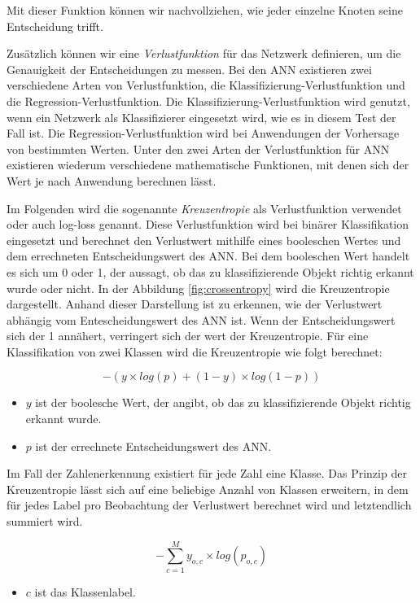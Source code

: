 Mit dieser Funktion können wir nachvollziehen, wie jeder einzelne Knoten seine Entscheidung trifft.\cite*{Braspenning1995}

Zusätzlich können wir eine \textit{Verlustfunktion} für das Netzwerk definieren, um die Genauigkeit der Entscheidungen zu messen. Bei den ANN existieren zwei verschiedene Arten von Verlustfunktion, die Klassifizierung-Verlustfunktion und die Regression-Verlustfunktion. 
Die Klassifizierung-Verlustfunktion wird genutzt, wenn ein Netzwerk als Klassifizierer eingesetzt wird, wie es in diesem Test der Fall ist. Die Regression-Verlustfunktion wird bei Anwendungen der Vorhersage von bestimmten Werten.
Unter den zwei Arten der Verlustfunktion für ANN existieren wiederum verschiedene mathematische Funktionen, mit denen sich der Wert je nach Anwendung berechnen lässt.\cite{dwivedi_2020}

Im Folgenden wird die sogenannte \textit{Kreuzentropie} als Verlustfunktion verwendet oder auch log-loss genannt. Diese Verlustfunktion wird bei binärer Klassifikation eingesetzt und berechnet den Verlustwert mithilfe eines booleschen Wertes und dem errechneten Entscheidungswert des ANN. Bei dem booleschen Wert handelt es sich um 0 oder 1, der aussagt, ob das zu klassifizierende Objekt richtig erkannt wurde oder nicht. In der Abbildung \ref*{fig:crossentropy} wird die Kreuzentropie dargestellt. Anhand dieser Darstellung ist zu erkennen, wie der Verlustwert abhängig vom Entescheidungswert des ANN ist. Wenn der Entscheidungswert sich der 1 annähert, verringert sich der wert der Kreuzentropie.
Für eine Klassifikation von zwei Klassen wird die Kreuzentropie wie folgt berechnet: 

\[-(y\times log(p) + (1 - y) \times log(1-p))\]

\begin{itemize}
	\item $y$ ist der boolesche Wert, der angibt, ob das zu klassifizierende Objekt richtig erkannt wurde.
	\item $p$ ist der errechnete Entscheidungswert des ANN.
\end{itemize}

Im Fall der Zahlenerkennung existiert für jede Zahl eine Klasse. Das Prinzip der Kreuzentropie lässt sich auf eine beliebige Anzahl von Klassen erweitern, in dem für jedes Label pro Beobachtung der Verlustwert berechnet wird und letztendlich summiert wird.

\[ -\sum_{c=1}^{M}y_{o,c} \times log(p_{o,c}) \]

\begin{itemize}
	\item $c$ ist das Klassenlabel.
\end{itemize}
\cite{10.2307/2348828}

